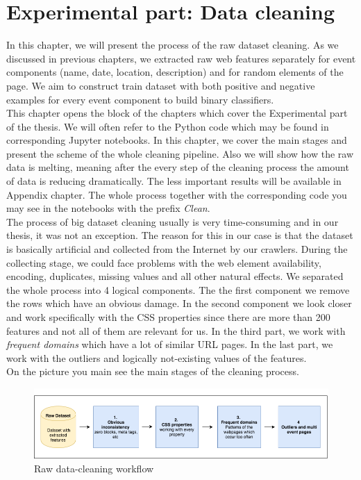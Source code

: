 \chapter{Experimental part: Data cleaning}
\label{chap:clean}
In this chapter, we will present the process of the raw dataset cleaning. As we discussed in previous chapters, we extracted raw web features separately for event components (name, date, location, description) and for random elements of the page. We aim to construct train dataset with both positive and negative examples for every event component to build binary classifiers. \\

This chapter opens the block of the chapters which cover the Experimental part of the thesis. We will often refer to the Python code which may be found in corresponding Jupyter notebooks. In this chapter, we cover the main stages and present the scheme of the whole cleaning pipeline. Also we will show how the raw data is melting, meaning after the every step of the cleaning process the amount of data is reducing dramatically. The less important results will be available in Appendix chapter. The whole process together with the corresponding code you may see in the notebooks with the prefix \textit{Clean}.\\

The process of big dataset cleaning usually is very time-consuming and in our thesis, it was not an exception. The reason for this in our case is that the dataset is basically artificial and collected from the Internet by our crawlers. During the collecting stage, we could face problems with the web element availability, encoding, duplicates, missing values and all other natural effects. We separated the whole process into 4 logical components. The the first component we remove the rows which have an obvious damage. In the second component we look closer and work specifically with the CSS properties since there are more than 200 features and not all of them are relevant for us. In the third part, we work with \textit{frequent domains} which have a lot of similar URL pages. In the last part, we work with the outliers and logically not-existing values of the features. \\

On the picture  you main see the main stages of the cleaning process.

\begin{figure}[h]
\begin{center}
\includegraphics[width=1.0\textwidth]{figures06/clean_workflow1}
\caption{Raw data-cleaning workflow}
\label{fig:clean}
\end{center}
\end{figure}


